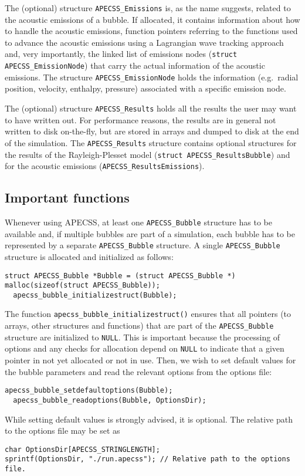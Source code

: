 The (optional) structure {\tt APECSS\_Emissions} is, as the name suggests, related to the acoustic emissions of a bubble. If allocated, it contains information about how to handle the acoustic emissions, function pointers referring to the functions used to advance the acoustic emissions using a Lagrangian wave tracking approach and, very importantly, the linked list of emissions nodes ({\tt struct APECSS\_EmissionNode}) that carry the actual information of the acoustic emissions. The structure {\tt APECSS\_EmissionNode}  holds the information (e.g.~radial position, velocity, enthalpy, pressure) associated with a specific emission node.

The (optional) structure {\tt APECSS\_Results} holds all the results the user may want to have written out. For performance reasons, the results are in general not written to disk on-the-fly, but are stored in arrays and dumped to disk at the end of the simulation. The {\tt APECSS\_Results} structure contains optional structures for the results of the Rayleigh-Plesset model ({\tt struct APECSS\_ResultsBubble}) and for the acoustic emissions ({\tt APECSS\_ResultsEmissions}).

\subsection{Important functions}

Whenever using APECSS, at least one {\tt APECSS\_Bubble} structure has to be available and, if multiple bubbles are part of a simulation, each bubble has to be represented by a separate {\tt APECSS\_Bubble} structure. A single {\tt APECSS\_Bubble} structure is allocated and initialized as follows:
\begin{lstlisting}[style=CStyle,numbers=none]
  struct APECSS_Bubble *Bubble = (struct APECSS_Bubble *) malloc(sizeof(struct APECSS_Bubble));
  apecss_bubble_initializestruct(Bubble);
\end{lstlisting}\vspace{-0.75em}
The function {\tt apecss\_bubble\_initializestruct()} ensures that all pointers (to arrays, other structures and functions) that are part of the {\tt APECSS\_Bubble} structure are initialized to {\tt NULL}. This is important because the processing of options and any checks for allocation depend on {\tt NULL} to indicate that a given pointer in not yet allocated or not in use.
Then, we wish to set default values for the bubble parameters and read the relevant options from the options file:
\begin{lstlisting}[style=CStyle,numbers=none]
  apecss_bubble_setdefaultoptions(Bubble);
  apecss_bubble_readoptions(Bubble, OptionsDir);
\end{lstlisting}\vspace{-0.75em}
While setting default values is strongly advised, it is optional. The relative path to the options file may be set as
\begin{lstlisting}[style=CStyle,numbers=none]
char OptionsDir[APECSS_STRINGLENGTH];
sprintf(OptionsDir, "./run.apecss"); // Relative path to the options file.
\end{lstlisting}

